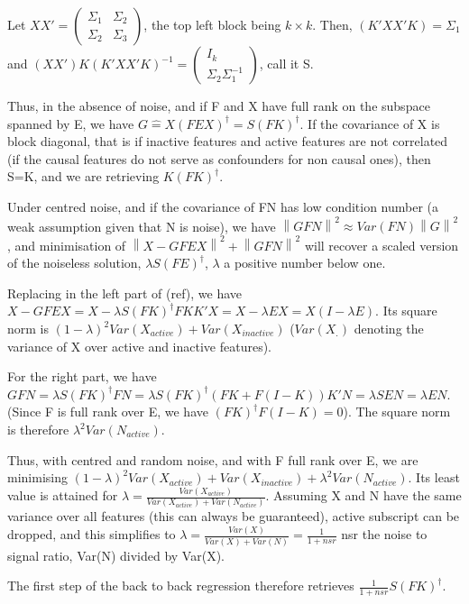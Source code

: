\documentclass{article}
\begin{document}
Let $XX' = \left(\begin{array}{c|c}\Sigma_{1} & \Sigma_{2} \\\hline \Sigma_{2} & \Sigma_{3}\end{array}\right)$, the top left block being $k\times k$. Then, $(K'XX'K)=\Sigma_{1}$ and $(XX')K(K'XX'K)^{-1}=\left(\begin{array}{c}I_{k} \\\hline \Sigma_{2} \Sigma_{1}^{-1}\end{array}\right)$, call it S.

Thus, in the absence of noise, and if F and X have full rank on the subspace spanned by E, we have $G\hat=X(FEX)^\dagger =S (FK)^\dagger$. If the covariance of X is block diagonal, that is if inactive features and active features are not correlated (if the causal features do not serve as confounders for non causal ones), then S=K, and we are retrieving $K (FK)^\dagger$.

Under centred noise, and if the covariance of FN has low condition number (a weak assumption given that N is noise), we have $\left \| GFN\right \| ^2 \approx Var(FN) \left \| G\right \| ^2$, and minimisation of $\left \| X-GFEX\right\| ^2  + \left \| GFN\right \| ^2$ will recover a scaled version of the noiseless solution, $\lambda S (FE)^\dagger$, $\lambda$ a positive number below one.

Replacing in the left part of (ref), we have $X-GFEX=X- \lambda S (FK)^\dagger FKK'X= X - \lambda EX=X(I-\lambda E)$. Its square norm is $(1-\lambda)^2 Var(X_{active}) + Var(X_{inactive})$ ($Var(X_{.})$ denoting the variance of X over active and inactive features).

For the right part, we have $GFN=\lambda S (FK)^\dagger FN= \lambda S (FK)^\dagger (FK+F(I-K))K'N= \lambda S EN=  \lambda EN$. (Since F is full rank over E, we have $(FK)^\dagger F(I-K)= 0$). The square norm is therefore $\lambda^2 Var(N_{active})$.

Thus, with centred and random noise, and with F full rank over E, we are minimising $(1-\lambda)^2 Var(X_{active}) + Var(X_{inactive})+\lambda^2 Var(N_{active})$. Its least value is attained for $\lambda = \frac{Var(X_{active})}{Var(X_{active})+Var(N_{active})}$. Assuming X and N have the same variance over all features (this can always be guaranteed), active subscript can be dropped, and this simplifies to $\lambda= \frac {Var(X)}{Var(X)+ Var(N)}=\frac{1}{1+nsr}$ nsr the noise to signal ratio, Var(N) divided by Var(X).

The first step of the back to back regression therefore retrieves $\frac{1}{1+nsr} S (FK)^\dagger$.
\end{document}
